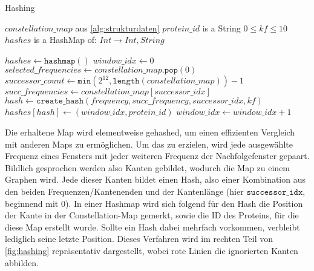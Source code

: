         \begin{algorithm}[H]
            \caption{Hashing}\label{alg:hashing}
            \begin{algorithmic}[1]
                \Require $constellation\_map$ aus \autoref{alg:strukturdaten}
                \Require $protein\_id$ is a String
                \Require $0 \leq kf \leq 10$
                \Ensure $hashes$ is a HashMap of: $Int \rightarrow Int, String$

                \State $hashes \gets \texttt{hashmap}()$
                \State $window\_idx \gets 0$
                \Repeat
                    \State $selected\_frequencies \gets constellation\_map.\texttt{pop}(0)$
                        \State $successor\_count \gets \texttt{min}(2^{12}, \texttt{length}(constellation\_map)) - 1$
                            \State $succ\_frequencies \gets constellation\_map[successor\_idx]$
                                \State $hash \gets \texttt{create\_hash}(frequency, succ\_frequency, successor\_idx, kf)$
                                \State $hashes[hash] \gets (window\_idx, protein\_id)$
                            \EndFor
                        \EndFor
                    \EndFor
                    \State $window\_idx \gets window\_idx + 1$
            \end{algorithmic}
        \end{algorithm}

        Die erhaltene Map wird elementweise gehashed, um einen effizienten Vergleich mit anderen Maps zu ermöglichen. Um das zu erzielen, wird jede ausgewählte Frequenz eines Fensters mit jeder weiteren Frequenz der Nachfolgefenster gepaart. Bildlich gesprochen werden also Kanten gebildet, wodurch die Map zu einem Graphen wird. Jede dieser Kanten bildet einen Hash, also einer Kombination aus den beiden Frequenzen/Kantenenden und der Kantenlänge (hier $\texttt{successor\_idx}$, beginnend mit 0). In einer Hashmap wird sich folgend für den Hash die Position der Kante in der Constellation-Map gemerkt, sowie die ID des Proteins, für die diese Map erstellt wurde. Sollte ein Hash dabei mehrfach vorkommen, verbleibt lediglich seine letzte Position. Dieses Verfahren wird im rechten Teil von \autoref{fig:hashing} repräsentativ dargestellt, wobei rote Linien die ignorierten Kanten abbilden.


